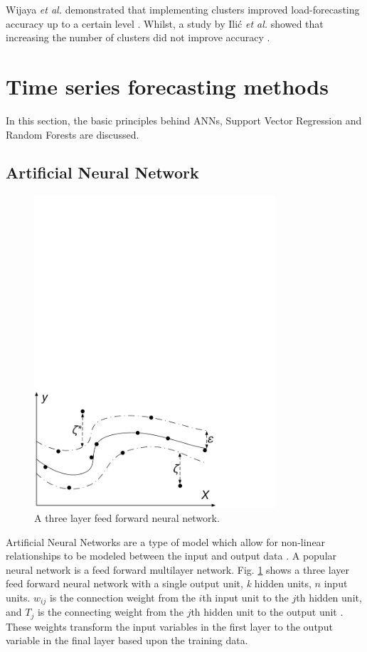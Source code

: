 Wijaya \textit{et al.} demonstrated that implementing clusters improved load-forecasting accuracy up to a certain level \cite{Wijaya2010}. Whilst, a study by Ili\'c \textit{et al.} showed that increasing the number of clusters did not improve accuracy \cite{Ilic2013}.


\section{Time series forecasting methods}

In this section, the basic principles behind ANNs, Support Vector Regression and Random Forests are discussed.

\subsection{Artificial Neural Network}


\begin{figure}
	\includegraphics[width=0.8\textwidth]{Chapter5/figures/short-term-forecasting/Kell_eEnergy_Fig2.pdf}
	\caption{A three layer feed forward neural network.}
	\label{fig:mlp}
\end{figure}


Artificial Neural Networks are a type of model which allow for non-linear relationships to be modeled between the input and output data \cite{Akaike1974}. A popular neural network is a feed forward multilayer network. Fig. \ref{fig:mlp} shows a three layer feed forward neural network with a single output unit, \textit{k} hidden units, $n$ input units. $w_{ij}$ is the connection weight from the $i$th input unit to the $j$th hidden unit,  and $T_j$ is the connecting weight from the $j$th hidden unit to the output unit \cite{Pao2007}. These weights transform the input variables in the first layer to the output variable in the final layer based upon the training data. 

